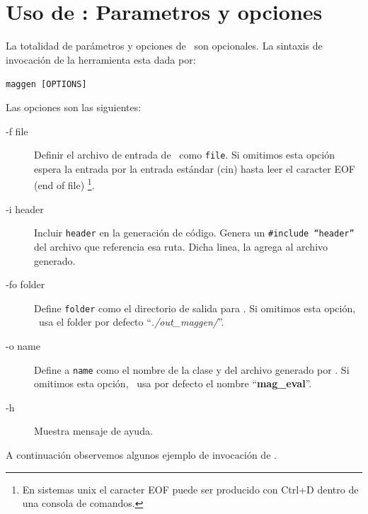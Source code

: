 \section{Uso de \maggen: Parametros y opciones}
La totalidad de parámetros y opciones de \maggen\ son opcionales. La sintaxis de invocación de la herramienta esta dada por:\\
\begin{center}\texttt{maggen [OPTIONS]}\end{center}
Las opciones son las siguientes:
\begin{description}
\item [-f  file] Definir el archivo de entrada de \maggen\ como \texttt{file}. Si omitimos esta opción \maggen espera la entrada por la entrada estándar (cin) hasta leer el caracter EOF (end of file) \footnote{En sistemas unix el caracter EOF puede ser producido con Ctrl+D dentro de una consola de comandos.}.
\item [-i  header] Incluir \texttt{header} en la generación de código. Genera un \texttt{\#include ``header''} del archivo que referencia esa ruta. Dicha linea, \maggen la agrega al archivo generado.
\item [-fo folder] Define \texttt{folder} como el directorio de salida para \maggen. Si omitimos esta opción, \maggen\ usa el folder por defecto ``\textit{./out\_maggen/}''.
\item [-o  name] Define a \texttt{name} como el nombre de la clase y del archivo generado por \maggen. Si omitimos esta opción, \maggen\ usa por defecto el nombre ``\textbf{mag\_eval}''.
\item [-h] Muestra mensaje de ayuda.
\end{description}
A continuación observemos algunos ejemplo de invocación de \maggen.

